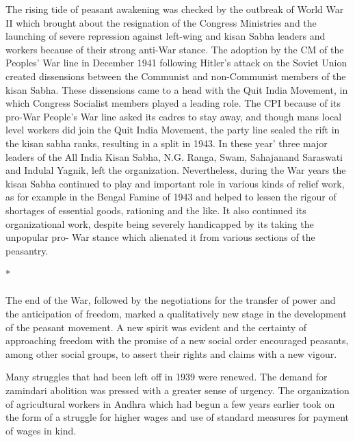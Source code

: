 The rising tide of peasant awakening was checked by the outbreak of World War II which brought about the resignation of the Congress Ministries and the launching of severe repression against left-wing and kisan Sabha leaders and workers because of their strong anti-War stance. The adoption by the CM of the Peoples' War line in December 1941 following Hitler's attack on the Soviet Union created dissensions between the Communist and non-Communist members of the kisan Sabha. These dissensions came to a head with the Quit India Movement, in which Congress Socialist members played a leading role. The CPI because of its pro-War People's War line asked its cadres to stay away, and though mans local level workers did join the Quit India Movement, the party line sealed the rift in the kisan sabha ranks, resulting in a split in 1943. In these year' three major leaders of the All India Kisan Sabha, N.G. Ranga, Swam, Sahajanand Saraswati and Indulal Yagnik, left the organization. Nevertheless, during the War years the kisan Sabha continued to play and important role in various kinds of relief work, as for example in the Bengal Famine of 1943 and helped to lessen the rigour of shortages of essential goods, rationing and the like. It also continued its organizational work, despite being severely handicapped by its taking the unpopular pro- War stance which alienated it from various sections of the peasantry.

\begin{center}*\end{center}

\paragraph*{}

The end of the War, followed by the negotiations for the transfer of power and the anticipation of freedom, marked a qualitatively new stage in the development of the peasant movement. A new spirit was evident and the certainty of approaching freedom with the promise of a new social order encouraged peasants, among other social groups, to assert their rights and claims with a new vigour.

Many struggles that had been left off in 1939 were renewed. The demand for zamindari abolition was pressed with a greater sense of urgency. The organization of agricultural workers in Andhra which had begun a few years earlier took on the form of a struggle for higher wages and use of standard measures for payment of wages in kind.

